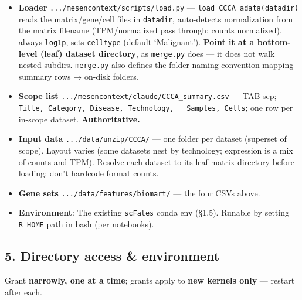 \documentclass[11pt,a4paper]{article}
\providecommand{\tightlist}{\setlength{\itemsep}{0pt}\setlength{\parskip}{0pt}}
\begin{document}
\begin{itemize}
\tightlist
\item
  \textbf{Loader} \texttt{.../mesencontext/scripts/load.py} ---
  \texttt{load\_CCCA\_adata(datadir)} reads the matrix/gene/cell files
  in \texttt{datadir}, auto-detects normalization from the matrix
  filename (TPM/normalized pass through; counts normalized), always
  \texttt{log1p}, sets \texttt{celltype} (default `Malignant').
  \textbf{Point it at a bottom-level (leaf) dataset directory}, as
  \texttt{merge.py} does --- it does not walk nested subdirs.
  \texttt{merge.py} also defines the folder-naming convention mapping
  summary rows → on-disk folders.
\item
  \textbf{Scope list} \texttt{.../mesencontext/claude/CCCA\_summary.csv}
  --- TAB-sep;
  \texttt{Title,\ Category,\ Disease,\ Technology,\ \ \ Samples,\ Cells};
  one row per in-scope dataset. \textbf{Authoritative.}
\item
  \textbf{Input data} \texttt{.../data/unzip/CCCA/} --- one folder per
  dataset (superset of scope). Layout varies (some datasets nest by
  technology; expression is a mix of counts and TPM). Resolve each
  dataset to its leaf matrix directory before loading; don't hardcode
  format counts.
\item
  \textbf{Gene sets} \texttt{.../data/features/biomart/} --- the four
  CSVs above.
\item
  \textbf{Environment}: The existing \texttt{scFates} conda env (§1.5).
  Runable by setting \texttt{R\_HOME} path in bash (per notebooks).
\end{itemize}

\hypertarget{directory-access-environment}{%
\subsection{5. Directory access \& environment}\label{directory-access-environment}}

Grant \textbf{narrowly, one at a time}; grants apply to \textbf{new
kernels only} --- restart after each.
\end{document}
